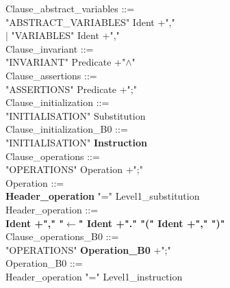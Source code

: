 \documentclass[12pt,a4paper,draft]{article}
\begin{document}
{\begin{sloppypar}
Clause\_abstract\_variables ::= \\
\hspace*{0.20in}  "ABSTRACT\_VARIABLES"  Ident +","\\
\hspace*{0.20in} $|$ "VARIABLES" Ident +","\\
Clause\_invariant ::= \\
\hspace*{0.20in}  "INVARIANT"  Predicate +"$\land$"\\
Clause\_assertions ::= \\
\hspace*{0.20in}  "ASSERTIONS" Predicate +";"\\
Clause\_initialization ::= \\
\hspace*{0.20in}  "INITIALISATION" Substitution\\
Clause\_initialization\_B0 ::= \\
\hspace*{0.20in}  "INITIALISATION" \textbf{Instruction}\\
Clause\_operations ::= \\
\hspace*{0.20in}  "OPERATIONS"  Operation +";"\\
Operation ::= \\
\hspace*{0.20in}   \textbf{Header\_operation}  "="  Level1\_substitution\\
   
\noindent Header\_operation ::= \\
\hspace*{0.20in}  \textbf{Ident +","  "$\leftarrow$"   Ident +"."   "(" Ident +"," ")" } \\  %
Clause\_operations\_B0 ::= \\
\hspace*{0.20in}  "OPERATIONS" \textbf{ Operation\_B0} +";"\\
Operation\_B0 ::= \\
\hspace*{0.20in}   Header\_operation  "="  Level1\_instruction\\
   
   

\end{sloppypar}}
\end{document}
